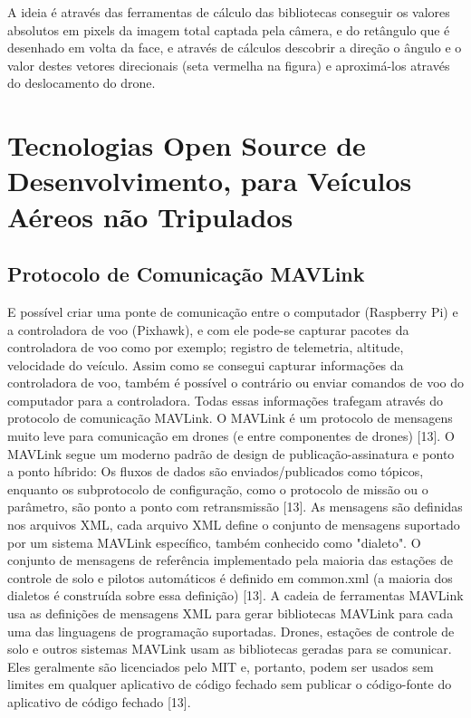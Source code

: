 A ideia é através das ferramentas de cálculo das bibliotecas conseguir os valores absolutos em pixels da imagem total captada pela câmera, e do retângulo que é desenhado em volta da face, e através de cálculos descobrir a direção o ângulo e o valor destes vetores direcionais (seta vermelha na figura) e aproximá-los através do deslocamento do drone.

\section{Tecnologias Open Source de Desenvolvimento, para Veículos Aéreos não Tripulados}

\subsection{Protocolo de Comunicação MAVLink}
E possível criar uma ponte de comunicação entre o computador (Raspberry Pi) e a controladora de voo (Pixhawk), e com ele pode-se capturar pacotes da controladora de voo como por exemplo; registro de telemetria, altitude, velocidade do veículo.
Assim como se consegui capturar informações da controladora de voo, também é possível o contrário ou enviar comandos de voo do computador para a controladora. Todas essas informações trafegam através do protocolo de comunicação MAVLink.
O MAVLink é um protocolo de mensagens muito leve para comunicação em drones (e entre componentes de drones) [13].
O MAVLink segue um moderno padrão de design de publicação-assinatura e ponto a ponto híbrido: Os fluxos de dados são enviados/publicados como tópicos, enquanto os subprotocolo de configuração, como o protocolo de missão ou o parâmetro, são ponto a ponto com retransmissão [13].
As mensagens são definidas nos arquivos XML, cada arquivo XML define o conjunto de mensagens suportado por um sistema MAVLink específico, também conhecido como "dialeto". O conjunto de mensagens de referência implementado pela maioria das estações de controle de solo e pilotos automáticos é definido em common.xml (a maioria dos dialetos é construída sobre essa definição) [13].
A cadeia de ferramentas MAVLink usa as definições de mensagens XML para gerar bibliotecas MAVLink para cada uma das linguagens de programação suportadas. Drones, estações de controle de solo e outros sistemas MAVLink usam as bibliotecas geradas para se comunicar. Eles geralmente são licenciados pelo MIT e, portanto, podem ser usados sem limites em qualquer aplicativo de código fechado sem publicar o código-fonte do aplicativo de código fechado [13].

